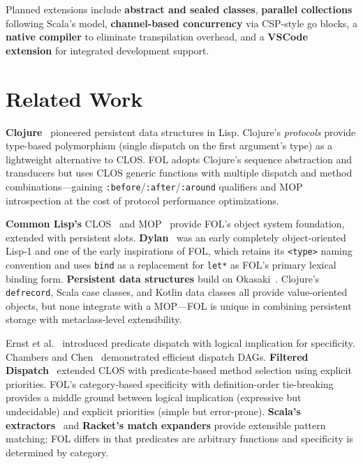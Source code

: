 \documentclass[sigconf,nonacm,review]{acmart}
\begin{document}
Planned extensions include \textbf{abstract and sealed classes}, \textbf{parallel collections} following Scala's model, \textbf{channel-based concurrency} via CSP-style go blocks, a \textbf{native compiler} to eliminate transpilation overhead, and a \textbf{VSCode extension} for integrated development support.

\section{Related Work}

\textbf{Clojure}~\cite{Hickey2008} pioneered persistent data structures in Lisp. Clojure's \textit{protocols} provide type-based polymorphism (single dispatch on the first argument's type) as a lightweight alternative to CLOS. FOL adopts Clojure's sequence abstraction and transducers but uses CLOS generic functions with multiple dispatch and method combinations---gaining \texttt{:before}/\texttt{:after}/\texttt{:around} qualifiers and MOP introspection at the cost of protocol performance optimizations.

\textbf{Common Lisp's} CLOS~\cite{Bobrow1988} and MOP~\cite{Kiczales1991} provide FOL's object system foundation, extended with persistent slots. \textbf{Dylan}~\cite{Apple1992} was an early completely object-oriented Lisp-1 and one of the early inspirations of FOL, which retains its \texttt{<type>} naming convention and uses \texttt{bind} as a replacement for \texttt{let*} as FOL's primary lexical binding form. \textbf{Persistent data structures} build on Okasaki~\cite{Okasaki1998}. Clojure's \texttt{defrecord}, Scala case classes, and Kotlin data classes all provide value-oriented objects, but none integrate with a MOP---FOL is unique in combining persistent storage with metaclass-level extensibility.

Ernst et al.~\cite{Ernst1998} introduced predicate dispatch with logical implication for specificity. Chambers and Chen~\cite{Chambers1999} demonstrated efficient dispatch DAGs. \textbf{Filtered Dispatch}~\cite{Orleans2002} extended CLOS with predicate-based method selection using explicit priorities. FOL's category-based specificity with definition-order tie-breaking provides a middle ground between logical implication (expressive but undecidable) and explicit priorities (simple but error-prone). \textbf{Scala's extractors}~\cite{Emir2007} and \textbf{Racket's match expanders} provide extensible pattern matching; FOL differs in that predicates are arbitrary functions and specificity is determined by category.
\end{document}
